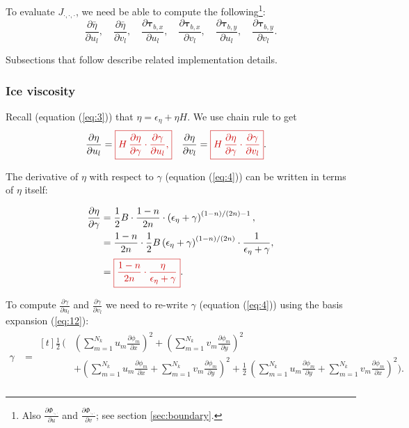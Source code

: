 \documentclass{amsart}
\newcommand{\T}{\boldsymbol{\tau}}
\newcommand{\diff}[2]{\ensuremath{\frac{\partial #1}{\partial #2}}}
\newcommand{\diffbasisexpansion}[3]{\ensuremath{\sum_{#3 = 1}^{N_k} {#1}_{#3} \diff{\phi_{#3}}{#2} }}
\newcommand{\UX}{\diffbasisexpansion{u}{x}{m}}
\newcommand{\UY}{\diffbasisexpansion{u}{y}{m}}
\newcommand{\VX}{\diffbasisexpansion{v}{x}{m}}
\newcommand{\VY}{\diffbasisexpansion{v}{y}{m}}
\newcommand{\basalshearstress}[1]{\T_{b#1}}
\newcommand{\taubx}{\basalshearstress{,x}}
\newcommand{\tauby}{\basalshearstress{,y}}
\newcommand{\highlight}[1]{{\color{red!80!black} \fbox{$ \displaystyle #1 $} }}
\begin{document}
To evaluate $J_{\cdot,\cdot,\cdot}$, we need be able to compute the following\footnote{Also $\diff{\Phi_{\cdot,\cdot}}{u}$ and $\diff{\Phi_{\cdot,\cdot}}{v}$; see section \ref{sec:boundary}.}:
\begin{equation*}
  \diff{\bar\eta}{u_l}, \quad \diff{\bar\eta}{v_l}, \quad \diff{\taubx}{u_l},
  \quad \diff{\taubx}{v_l}, \quad \diff{\tauby}{u_l}, \quad \diff{\tauby}{v_l}.
\end{equation*}

Subsections that follow describe related implementation details.


\subsubsection{Ice viscosity}
\label{sec:viscosity-evaluation}

Recall (equation (\ref{eq:3})) that $\eta = \epsilon_{\eta} + \eta H$. We use chain rule to get
\begin{align*}
  \diff{\eta}{u_l} &= \highlight{ H\,\diff{\eta}{\gamma}\cdot \diff{\gamma}{u_l}, } &   \diff{\eta}{v_l} &= \highlight{ H\,\diff{\eta}{\gamma}\cdot \diff{\gamma}{v_l} }.
\end{align*}

The derivative of $\eta$ with respect to $\gamma$ (equation (\ref{eq:4})) can be written in terms of $\eta$ itself:

\begin{align*}
  \diff{\eta}{\gamma} & = \frac{1}{2} B \cdot \frac{1 - n}{2n} \cdot \left(\epsilon_{\eta} + \gamma \right)^{(1 - n) / (2n) - 1}, \\
      & = \frac{1 - n}{2n} \cdot \frac{1}{2} B \left( \epsilon_{\eta} + \gamma \right)^{(1 - n) / (2n)} \cdot \frac{1}{\epsilon_{\eta} + \gamma}, \\
      & = \highlight{ \frac{1 - n}{2n} \cdot \frac{\eta}{\epsilon_{\eta} + \gamma} }.
\end{align*}

To compute $\diff{\gamma}{u_l}$ and $\diff{\gamma}{v_l}$ we need to re-write $\gamma$ (equation (\ref{eq:4})) using the basis expansion (\ref{eq:12}):
\begin{align*}
  \gamma &=
           \begin{aligned}[t]
             \frac{1}{2}\, \Bigg(&\left(\UX\right)^2 + \left(\VY\right)^2 \\
             & + \left(\UX + \VY\right)^2 + \frac{1}{2}\, \left(\UY + \VX\right)^2\Bigg). \\
           \end{aligned}
\end{align*}
\end{document}
